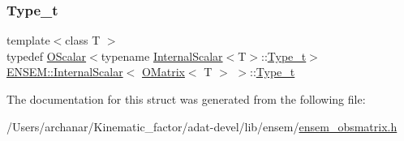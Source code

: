 \subsubsection{\texorpdfstring{Type\_t}{Type\_t}\hspace{0.1cm}{\footnotesize\ttfamily [3/3]}}
{\footnotesize\ttfamily template$<$class T $>$ \\
typedef \mbox{\hyperlink{classENSEM_1_1OScalar}{O\+Scalar}}$<$typename \mbox{\hyperlink{structENSEM_1_1InternalScalar}{Internal\+Scalar}}$<$T$>$\+::\mbox{\hyperlink{structENSEM_1_1InternalScalar_3_01OMatrix_3_01T_01_4_01_4_a1e1ab78c916da9274cc273535dd0a08a}{Type\+\_\+t}}$>$ \mbox{\hyperlink{structENSEM_1_1InternalScalar}{E\+N\+S\+E\+M\+::\+Internal\+Scalar}}$<$ \mbox{\hyperlink{classENSEM_1_1OMatrix}{O\+Matrix}}$<$ T $>$ $>$\+::\mbox{\hyperlink{structENSEM_1_1InternalScalar_3_01OMatrix_3_01T_01_4_01_4_a1e1ab78c916da9274cc273535dd0a08a}{Type\+\_\+t}}}



The documentation for this struct was generated from the following file\+:\begin{DoxyCompactItemize}
\item 
/\+Users/archanar/\+Kinematic\+\_\+factor/adat-\/devel/lib/ensem/\mbox{\hyperlink{adat-devel_2lib_2ensem_2ensem__obsmatrix_8h}{ensem\+\_\+obsmatrix.\+h}}\end{DoxyCompactItemize}
